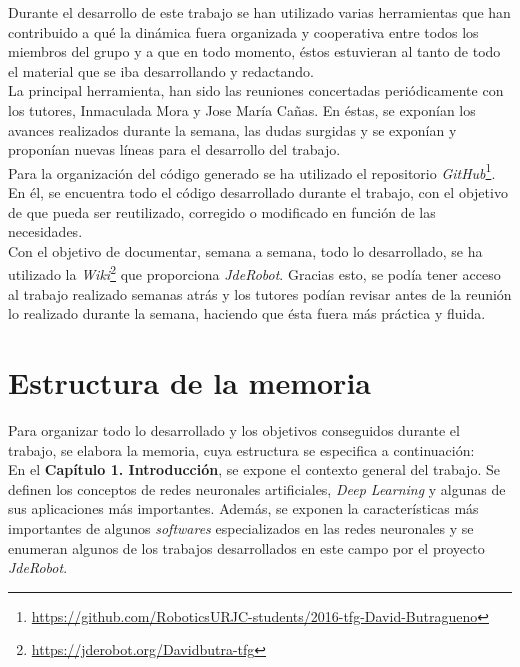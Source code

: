 \documentclass[a4paper, 12pt, oneside]{book}
\begin{document}
Durante el desarrollo de este trabajo se han utilizado varias herramientas que han contribuido a qué la dinámica fuera organizada y cooperativa entre todos los miembros del grupo y a que en todo momento, éstos estuvieran al tanto de todo el material que se iba desarrollando y redactando.\\

La principal herramienta, han sido las reuniones concertadas periódicamente con los tutores, Inmaculada Mora y Jose María Cañas. En éstas, se exponían los avances realizados durante la semana, las dudas surgidas y se exponían y proponían nuevas líneas para el desarrollo del trabajo.\\

Para la organización del código generado se ha utilizado el repositorio \textit{GitHub}\footnote{\url{https://github.com/RoboticsURJC-students/2016-tfg-David-Butragueno}}. En él, se encuentra todo el código desarrollado durante el trabajo, con el objetivo de que pueda ser reutilizado, corregido o modificado en función de las necesidades.\\

Con el objetivo de documentar, semana a semana, todo lo desarrollado, se ha utilizado la \textit{Wiki}\footnote{\url{https://jderobot.org/Davidbutra-tfg}} que proporciona \textit{JdeRobot}. Gracias esto, se podía tener acceso al trabajo realizado semanas atrás y los tutores podían revisar antes de la reunión lo realizado durante la semana, haciendo que ésta fuera más práctica y fluida.

\section{Estructura de la memoria}

Para organizar todo lo desarrollado y los objetivos conseguidos durante el trabajo, se elabora la memoria, cuya estructura se especifica a continuación:\\

En el \textbf{Capítulo 1. Introducción}, se expone el contexto general del trabajo. Se definen los conceptos de redes neuronales artificiales, \textit{Deep Learning} y algunas de sus aplicaciones más importantes. Además, se exponen la características más importantes de algunos \textit{softwares} especializados en las redes neuronales y se enumeran algunos de los trabajos desarrollados en este campo por el proyecto \textit{JdeRobot}.\\
\end{document}
